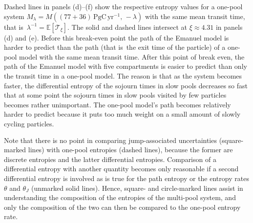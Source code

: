 \documentclass[smallextended]{svjour3}
\newcommand{\E}{\mathbb{E}}
\newcommand{\TT}{\mathcal{T}}
\newcommand{\peta}{\mathrm{P}}
\newcommand{\gC}{\mathrm{gC}}
\newcommand{\yr}{\mathrm{yr}}
\newcommand{\ie}{that is}
\begin{document}
Dashed lines in panels (d)--(f) show the respective entropy values for a one-pool system $M_\lambda=M((77+36)\,\peta\gC\,\yr^{-1},\, -\lambda)$ with the same mean transit time, \ie\ $\lambda^{-1} = \E\left[\TT_\xi\right]$.
The solid and dashed lines intersect at $\xi\approx4.31$ in panels (d) and (e).
Before this break-even point the path of the Emanuel model is harder to predict than the path (\ie\ the exit time of the particle) of a one-pool model with the same mean transit time.
After this point of break even, the path of the Emanuel model with five compartments is easier to predict than only the transit time in a one-pool model.
The reason is that as the system becomes faster, the differential entropy of the sojourn times in slow pools decreases so fast that at some point the sojourn times in slow pools visited by few particles becomes rather unimportant.
The one-pool model's path becomes relatively harder to predict because it puts too much weight on a small amount of slowly cycling particles.

Note that there is no point in comparing jump-associated uncertainties (square-marked lines) with one-pool entropies (dashed lines), because the former are discrete entropies and the latter differential entropies.
Comparison of a differential entropy with another quantity becomes only reasonable if a second differential entropy is involved as is true for the path entropy or the entropy rates $\theta$ and $\theta_J$ (unmarked solid lines).
Hence, square- and circle-marked lines assist in understanding the composition of the entropies of the multi-pool system, and only the composition of the two can then be compared to the one-pool entropy rate.
\end{document}
